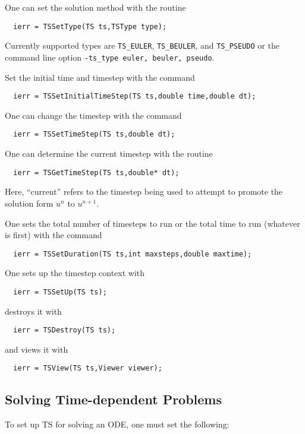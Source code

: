 One can set the solution method with the routine
\begin{verbatim}
  ierr = TSSetType(TS ts,TSType type);
\end{verbatim}
 Currently supported types are {\tt TS\_EULER},
{\tt TS\_BEULER}, and {\tt TS\_PSEUDO}
  
or the command line option
{\tt -ts\_type euler, beuler, pseudo}.  


Set the initial time and timestep with the command
\begin{verbatim}
  ierr = TSSetInitialTimeStep(TS ts,double time,double dt);
\end{verbatim}
One  can change the timestep with the command
\begin{verbatim}
  ierr = TSSetTimeStep(TS ts,double dt);
\end{verbatim}
One  
can  determine the current timestep with the routine
\begin{verbatim}
  ierr = TSGetTimeStep(TS ts,double* dt);
\end{verbatim}
Here, ``current'' refers to the timestep being used to attempt to
promote the solution form $ u^n $ to $ u^{n+1}. $

One sets the total number of timesteps to run or the total time to run 
(whatever is first) with the command 
\begin{verbatim}
  ierr = TSSetDuration(TS ts,int maxsteps,double maxtime);
\end{verbatim}
One sets up the timestep context with 
\begin{verbatim}
  ierr = TSSetUp(TS ts);
\end{verbatim}
destroys it with 
\begin{verbatim}
  ierr = TSDestroy(TS ts);
\end{verbatim}
and views it with 
\begin{verbatim}
  ierr = TSView(TS ts,Viewer viewer);
\end{verbatim}

\subsection{Solving Time-dependent Problems}
To set up TS for solving an ODE, one must set the following:

